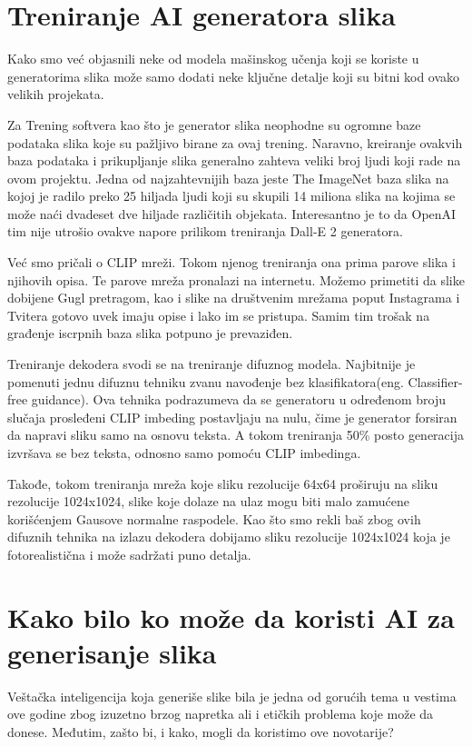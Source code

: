 \documentclass[12pt, letterpaper]{article}
\begin{document}
\pagebreak

\section{Treniranje AI generatora slika}

Kako smo već objasnili neke od modela mašinskog učenja koji se koriste u generatorima slika može samo dodati neke ključne detalje koji su bitni kod ovako velikih projekata.

Za Trening softvera kao što je generator slika neophodne su ogromne baze podataka slika koje su pažljivo birane za ovaj trening. Naravno, kreiranje ovakvih baza podataka i prikupljanje slika generalno zahteva veliki broj ljudi koji rade na ovom projektu. Jedna od najzahtevnijih baza jeste The ImageNet baza slika na kojoj je radilo preko 25 hiljada ljudi koji su skupili 14 miliona slika na kojima se može naći dvadeset dve hiljade različitih objekata. Interesantno je to da OpenAI tim nije utrošio ovakve napore prilikom treniranja Dall-E 2 generatora. \cite{clip}

Već smo pričali o CLIP mreži. Tokom njenog treniranja ona prima parove slika i njihovih opisa. Te parove mreža pronalazi na internetu. Možemo primetiti da slike dobijene Gugl pretragom, kao i slike na društvenim mrežama poput Instagrama i Tvitera gotovo uvek imaju opise i lako im se pristupa. Samim tim trošak na građenje iscrpnih baza slika potpuno je prevaziđen.\cite{clip, openai_dali}

Treniranje dekodera svodi se na treniranje difuznog modela. Najbitnije je pomenuti jednu difuznu tehniku zvanu navođenje bez klasifikatora(eng. Classifier-free guidance). Ova tehnika podrazumeva da se generatoru u određenom broju slučaja prosleđeni CLIP imbeding postavljaju na nulu, čime je generator forsiran da napravi sliku samo na osnovu teksta. A tokom treniranja 50\% posto generacija izvršava se bez teksta, odnosno samo pomoću CLIP imbedinga.

Takođe, tokom treniranja mreža koje sliku rezolucije 64x64 proširuju na sliku rezolucije 1024x1024, slike koje dolaze na ulaz mogu biti malo zamućene korišćenjem Gausove normalne raspodele. Kao što smo rekli baš zbog ovih difuznih tehnika na izlazu dekodera dobijamo sliku rezolucije 1024x1024 koja je fotorealistična i može sadržati puno detalja.\cite{openai_dali}

\pagebreak

\section{Kako bilo ko može da koristi AI za generisanje slika}
Veštačka inteligencija koja generiše slike bila je jedna od gorućih tema u vestima ove godine zbog izuzetno brzog napretka ali i etičkih problema koje može da donese. Međutim, zašto bi, i kako, mogli da koristimo ove novotarije?
\end{document}
